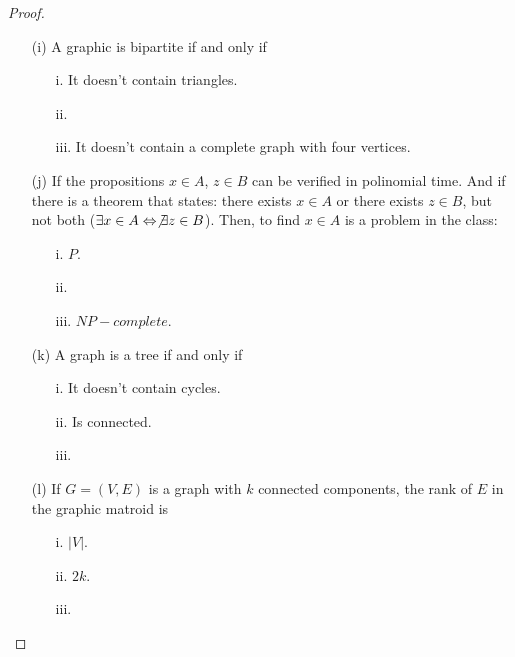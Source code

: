 \begin{proof}
\begin{itemize}
        \item[(i)] A graphic is bipartite if and only if
                    \begin{itemize}
                        \item[i.] It doesn't contain triangles.
                        \item[ii.] 
                        \item[iii.] It doesn't contain a complete graph with four vertices.
                    \end{itemize}

        \item[(j)] If the propositions $x \in A$, $z \in B$ can be verified in polinomial time.
                 And if there is a theorem that states: there exists $x \in A$ or there exists
                 $z \in B$, but not both ($\exists x \in A \Leftrightarrow \not\exists z \in B$).
                Then, to find $x \in A$ is a problem in the class:
                    \begin{itemize}
                        \item[i.] $P$.
                        \item[ii.]  
                        \item[iii.] $NP-complete$.
                    \end{itemize}

        \item[(k)] A graph is a tree if and only if
                    \begin{itemize}
                        \item[i.] It doesn't contain cycles.
                        \item[ii.] Is connected.
                        \item[iii.] 
                    \end{itemize}

        \item[(l)] If $G = (V, E)$ is a graph with $k$ connected components, the rank of $E$ in the
                 graphic matroid is
                    \begin{itemize}
                        \item[i.] $|V|$.
                        \item[ii.] $2k$.
                        \item[iii.] 
                    \end{itemize}


\end{itemize}
\end{proof}
